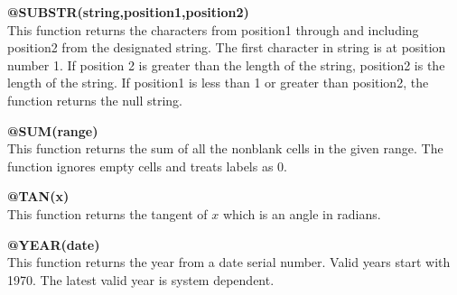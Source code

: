{\bf @SUBSTR(string,position1,position2)}\\
    This function returns the characters from position1 through and including 
position2 from the designated string.  The first character in string is at 
position number 1.  If position 2 is greater than the length of the string, 
position2 is the length of the string.  If position1 is less than 1 or greater 
than position2, the function returns the null string.

{\bf @SUM(range)}\\
    This function returns the sum of all the nonblank cells in the given 
range.  The function ignores empty cells and treats labels as 0.

{\bf @TAN(x)}\\
    This function returns the tangent of $x$ which is an angle in radians.

{\bf @YEAR(date)}\\
    This function returns the year from a date serial number.  Valid years 
start with 1970.  The latest valid year is system dependent.

